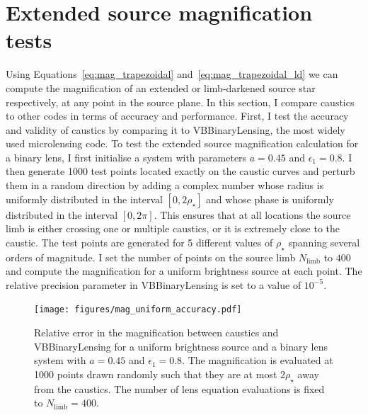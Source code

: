 \documentclass[12pt,dvipsnames]{report}
\newcommand{\ssf}[1]{\textsf{#1}}
\begin{document}
\section{Extended source magnification tests}
Using Equations~\ref{eq:mag_trapezoidal} and~\ref{eq:mag_trapezoidal_ld} we can compute the 
magnification of an extended or limb-darkened source star respectively, at any point in the 
source plane. In this section, I compare \ssf{caustics} to other codes in terms of accuracy
and performance. First, I test the accuracy and validity of \ssf{caustics} by comparing it 
to \ssf{VBBinaryLensing}, the most widely used microlensing code. To test the extended 
source magnification calculation for a binary lens,  I first initialise a system with parameters 
$a=0.45$ and $\epsilon_1=0.8$.  I then generate 1000 test points located exactly on the caustic 
curves and perturb them in a random direction by adding a complex number whose radius 
is uniformly distributed in the interval $[0, 2\rho_\star]$ 
and whose phase is uniformly distributed in the interval $[0, 2\pi]$. This ensures that at all 
locations the source limb is either crossing one or multiple caustics, or it is extremely 
close to the caustic. 
The test points are generated for 5 different values of $\rho_\star$ spanning several 
orders of magnitude. I set the number of points on the source limb  $N_\mathrm{limb}$ to 
$400$ and compute the magnification for a uniform brightness source at each point. The 
relative precision parameter in \ssf{VBBinaryLensing} is set to a value of $10^{-5}$. 

\begin{figure}[t]
    \begin{centering}
        \texttt{[image: figures/mag\_uniform\_accuracy.pdf]}
        \caption{Relative error in the magnification between \ssf{caustics} and 
        \ssf{VBBinaryLensing} for a uniform brightness source and a binary 
        lens system with $a=0.45$ and $\epsilon_1=0.8$. The magnification is evaluated at 
        1000 points drawn randomly such that they are at most $2\rho_\star$ away from the
        caustics. The number of lens equation evaluations is fixed to $N_\mathrm{limb}=400$.}
            \label{fig:mag_uniform_accuracy}
    \end{centering}
\end{figure}
\end{document}
